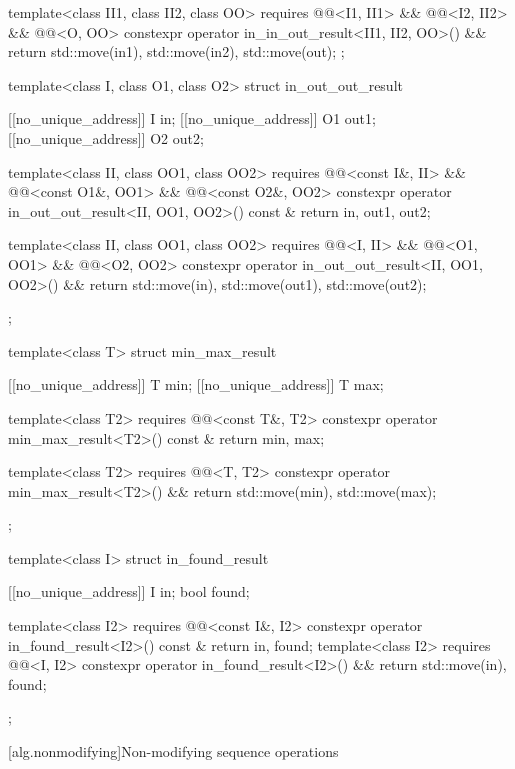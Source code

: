 \begin{codeblock}
{{    template<class II1, class II2, class OO>
      requires @@<I1, II1> &&
               @@<I2, II2> &&
               @@<O, OO>
    constexpr operator in_in_out_result<II1, II2, OO>() && {
      return {std::move(in1), std::move(in2), std::move(out)};
    }
  };

  template<class I, class O1, class O2>
  struct in_out_out_result {
    [[no_unique_address]] I  in;
    [[no_unique_address]] O1 out1;
    [[no_unique_address]] O2 out2;

    template<class II, class OO1, class OO2>
      requires @@<const I&, II> &&
               @@<const O1&, OO1> &&
               @@<const O2&, OO2>
    constexpr operator in_out_out_result<II, OO1, OO2>() const & {
      return {in, out1, out2};
    }

    template<class II, class OO1, class OO2>
      requires @@<I, II> &&
               @@<O1, OO1> &&
               @@<O2, OO2>
    constexpr operator in_out_out_result<II, OO1, OO2>() && {
      return {std::move(in), std::move(out1), std::move(out2)};
    }
  };

  template<class T>
  struct min_max_result {
    [[no_unique_address]] T min;
    [[no_unique_address]] T max;

    template<class T2>
      requires @@<const T&, T2>
    constexpr operator min_max_result<T2>() const & {
      return {min, max};
    }

    template<class T2>
      requires @@<T, T2>
    constexpr operator min_max_result<T2>() && {
      return {std::move(min), std::move(max)};
    }
  };

  template<class I>
  struct in_found_result {
    [[no_unique_address]] I in;
    bool found;

    template<class I2>
      requires @@<const I&, I2>
    constexpr operator in_found_result<I2>() const & {
      return {in, found};
    }
    template<class I2>
      requires @@<I, I2>
    constexpr operator in_found_result<I2>() && {
      return {std::move(in), found};
    }
  };
}
\end{codeblock}

[alg.nonmodifying]{Non-modifying sequence operations}

